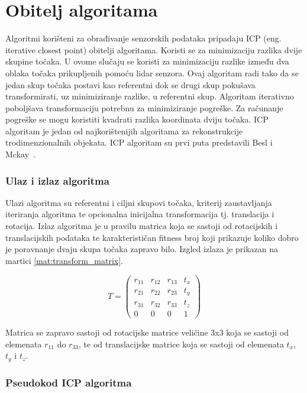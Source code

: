 \section{Obitelj algoritama}

Algoritmi korišteni za obrađivanje senzorskih podataka pripadaju ICP (eng. iterative closest point) obitelji algoritama. Koristi se za minimizaciju razlika dvije skupine točaka. U ovome slučaju se koristi za minimizaciju razlike između dva oblaka točaka prikupljenih pomoću lidar senzora. Ovaj algoritam radi tako da se jedan skup točaka postavi kao referentni dok se drugi skup pokušava transformirati, uz minimiziranje razlike, u referentni skup. Algoritam iterativno poboljšava transformaciju potrebnu za minimiziranje pogreške. Za računanje pogreške se mogu koristiti kvadrati razlika koordinata dviju točaka. ICP algoritam je jedan od najkorištenijih algoritama za rekonstrukcije trodimenzionalnih objekata. ICP algoritam su prvi puta predstavili Besl i Mckay~\cite{beslmckay121791}.

\subsubsection{Ulaz i izlaz algoritma}

Ulazi algoritma su referentni i ciljni skupovi točaka, kriterij zaustavljanja iteriranja algoritma te opcionalna inicijalna transformacija tj. translacija i rotacija. Izlaz algoritma je u pravilu matrica koja se sastoji od rotacijskih i translacijskih podataka te karakterističan fitness broj koji prikazuje koliko dobro je poravnanje dvaju skupa točaka zapravo bilo. Izgled izlaza je prikazan na martici \ref{mat:transform_matrix}.

\begin{equation}
  T =
  \begin{pmatrix}
    r_{11} & r_{12} & r_{13} & t_{x}\\
    r_{21} & r_{22} & r_{23} & t_{y}\\
    r_{31} & r_{32} & r_{33} & t_{z}\\
    0      & 0      & 0      & 1
  \end{pmatrix}
  \label{mat:transform_matrix}
\end{equation}

Matrica se zapravo sastoji od rotacijske matrice veličine 3x3 koja se sastoji od elemenata $r_{11}$ do $r_{33}$, te od translacijske matrice koja se sastoji od elemenata $t_{x}$, $t_{y}$ i $t_{z}$. 

\subsubsection{Pseudokod ICP algoritma}

